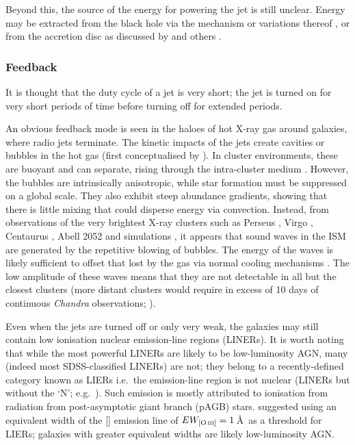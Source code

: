 			Beyond this, the source of the energy for powering the jet is still unclear. Energy may be extracted from the black hole via the \citet{Blandford1977} mechanism or variations thereof \citep[e.g.][]{Koide2002}, or from the accretion disc as discussed by \citet{Blandford1982} and others \citep[e.g.][]{Hujeirat2003}. 

		\subsubsection{Feedback}
			\label{subsubsec:JetFeedback}
			It is thought that the duty cycle of a jet is very short; the jet is turned on for very short periods of time before turning off for extended periods. 

			An obvious feedback mode is seen in the haloes of hot X-ray gas around galaxies, where radio jets terminate. The kinetic impacts of the jets create cavities or bubbles in the hot gas (first conceptualised by \citealt{Gull1973}). In cluster environments, these are buoyant and can separate, rising through the intra-cluster medium \citep[e.g.][]{Churazov2000, Churazov2001, McNamara2000}. However, the bubbles are intrinsically anisotropic, while star formation must be suppressed on a global scale. They also exhibit steep abundance gradients, showing that there is little mixing that could disperse energy via convection. Instead, from observations of the very brightest X-ray clusters such as Perseus \citep{Fabian2003, Fabian2006}, Virgo \citep{Forman2007}, Centaurus \citep{Sanders2008}, Abell 2052 \citep{Blanton2011} and simulations \citep[e.g.][]{Ruszkowski2004, Sijacki2006}, it appears that sound waves in the ISM are generated by the repetitive blowing of bubbles. The energy of the waves is likely sufficient to offset that lost by the gas via normal cooling mechanisms \citep{Fabian2003}. The low amplitude of these waves means that they are not detectable in all but the closest clusters (more distant clusters would require in excess of 10 days of continuous \textit{Chandra} observations; \citealt{Graham2008}).

			Even when the jets are turned off or only very weak, the galaxies may still contain low ionisation nuclear emission-line regions (LINERs). It is worth noting that while the most powerful LINERs are likely to be low-luminosity AGN, many (indeed most SDSS-classified LINERs) are not; they belong to a recently-defined category known as LIERs i.e.\ the emission-line region is not nuclear (LINERs but without the `N'; e.g.\ \citealt{Sarzi2005, Sarzi2010, Singh2013, Belfiore2016a}). Such emission is mostly attributed to ionisation from radiation from post-asymptotic giant branch (pAGB) stars. \citet{Capetti2011} suggested using an equivalent width of the [] emission line of $EW_\text{[\ion{O}{iii}]} = 1$\,\AA\ as a threshold for LIERs; galaxies with greater equivalent widths are likely low-luminosity AGN.

